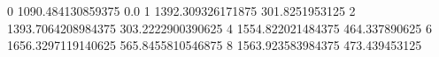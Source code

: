0 1090.484130859375 0.0
1 1392.309326171875 301.8251953125
2 1393.7064208984375 303.2222900390625
4 1554.822021484375 464.337890625
6 1656.3297119140625 565.8455810546875
8 1563.923583984375 473.439453125
